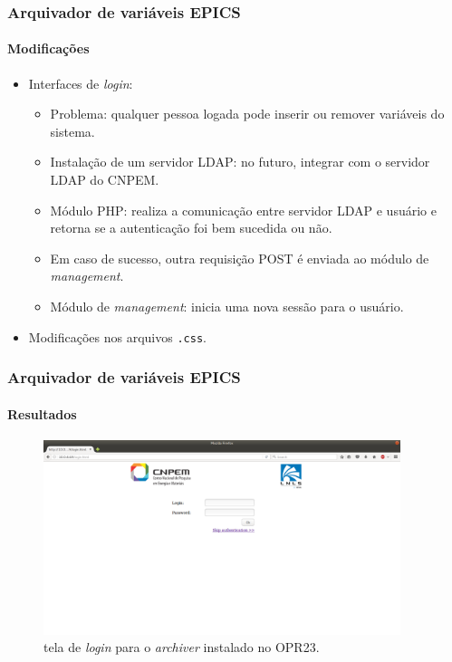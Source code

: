 \begin{frame}
\frametitle {Arquivador de variáveis EPICS}
\framesubtitle{Modificações}

\begin{itemize}
  \item Interfaces de \textit{login}:
  \begin{itemize}
    \item Problema: qualquer pessoa logada pode inserir ou remover variáveis do
    sistema.
    \item Instalação de um servidor LDAP: no futuro, integrar com o servidor
    LDAP do CNPEM.
    \item Módulo PHP: realiza a comunicação entre servidor LDAP e usuário e
    retorna se a autenticação foi bem sucedida ou não.
    \item Em caso de sucesso, outra requisição POST é enviada ao módulo de
    \textit{management}.
    \item Módulo de \textit{management}: inicia uma nova sessão para o usuário.
  \end{itemize}
  \item Modificações nos arquivos \texttt{.css}.
\end{itemize}

\end{frame}


\begin{frame}
\frametitle {Arquivador de variáveis EPICS}
\framesubtitle{Resultados}

\begin{figure}[h]

\centering
\includegraphics[width=0.93\textwidth]{image/login}
\caption {tela de \textit{login} para o \textit{archiver} instalado no OPR23.}
\label{fig:login}
\end{figure}

\end{frame}

